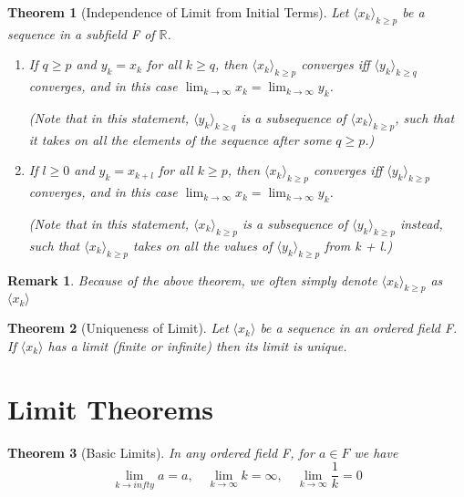 \documentclass[11pt, oneside]{book}
\theoremstyle{break}
\newtheorem{thm}{Theorem}[section]
\newtheorem*{remark}{Remark}
\newcommand{\bb}[1]{\mathbb{#1}}		%
\begin{document}
\begin{thm}[Independence of Limit from Initial Terms]
	Let $\langle x_k \rangle_{k \geq p}$ be a sequence in a subfield F of $\bb{R}$.
	\begin{enumerate}
		\item If $q \geq p$ and $y_k = x_k$ for all $k \geq q$, then $\langle x_k \rangle_{k \geq p}$ converges iff $\langle y_k \rangle_{k \geq q}$ converges, and in this case $\lim_{k \to \infty} x_k = \lim_{k \to \infty} y_k$.

		(Note that in this statement, $\langle y_k \rangle_{k \geq q}$ is a subsequence of $\langle x_k \rangle_{k \geq p}$, such that it takes on all the elements of the sequence after some $q \geq p$.)
		\item If $l \geq 0$ and $y_k = x_{k + l}$ for all $k \geq p$, then $\langle x_k \rangle_{k \geq p}$ converges iff $\langle y_k \rangle_{k \geq p}$ converges, and in this case $\lim_{k \to \infty} x_k = \lim_{k \to \infty} y_k$.

		(Note that in this statement, $\langle x_k \rangle_{k \geq p}$ is a subsequence of $\langle y_k \rangle_{k \geq p}$ instead, such that $\langle x_k \rangle_{k \geq p}$ takes on all the values of $\langle y_k \rangle_{k \geq p}$ from k + l.)
	\end{enumerate}
\end{thm}

\begin{remark}
	Because of the above theorem, we often simply denote $\langle x_k \rangle_{k \geq p}$ as $\langle x_k \rangle$
\end{remark}

\begin{thm}[Uniqueness of Limit]
	Let $\langle x_k \rangle$ be a sequence in an ordered field F. If $\langle x_k \rangle$ has a limit (finite or infinite) then its limit is unique.
\end{thm}


\section{Limit Theorems}

\begin{thm}[Basic Limits]
	In any ordered field F, for $a \in F$ we have
	\[
		\lim_{k \to infty} a = a, \quad \lim_{k \to \infty} k = \infty, \quad \lim_{k \to \infty} \frac{1}{k} = 0
	\]
\end{thm}
\end{document}
